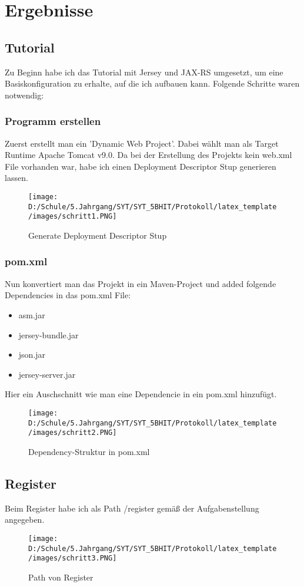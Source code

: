 
\section{Ergebnisse}
\label{sec:Ergebnisse}
\subsection{Tutorial}
Zu Beginn habe ich das Tutorial mit Jersey und JAX-RS umgesetzt, um eine Basiskonfiguration zu erhalte, auf die ich aufbauen kann. Folgende Schritte waren notwendig:
\subsubsection{Programm erstellen}
Zuerst erstellt man ein 'Dynamic Web Project'. Dabei wählt man als Target Runtime Apache Tomcat v9.0. Da bei der Erstellung des Projekts kein web.xml File vorhanden war, habe ich einen Deployment Descriptor Stup generieren lassen.

\begin{figure}[htbp] 
  \centering
     \texttt{[image: D:/Schule/5.Jahrgang/SYT/SYT\_5BHIT/Protokoll/latex\_template/images/schritt1.PNG]}
  \caption{Generate Deployment Descriptor Stup}
  \label{fig:Bild1}
\end{figure}

\subsubsection{pom.xml}
Nun konvertiert man das Projekt in ein Maven-Project und added folgende Dependencies in das pom.xml File:
\begin{itemize}
	\item asm.jar
	\item jersey-bundle.jar
	\item json.jar
	\item jersey-server.jar
\end{itemize}

Hier ein Auschschnitt wie man eine Dependencie in ein pom.xml hinzufügt.
\begin{figure}[htbp] 
  \centering
     \texttt{[image: D:/Schule/5.Jahrgang/SYT/SYT\_5BHIT/Protokoll/latex\_template/images/schritt2.PNG]}
  \caption{Dependency-Struktur in pom.xml}
  \label{fig:Bild1}
\end{figure}

\subsection{Register}
Beim Register habe ich als Path /register gemäß der Aufgabenstellung angegeben.
\begin{figure}[htbp] 
  \centering
     \texttt{[image: D:/Schule/5.Jahrgang/SYT/SYT\_5BHIT/Protokoll/latex\_template/images/schritt3.PNG]}
  \caption{Path von Register}
  \label{fig:Bild1}
\end{figure}


